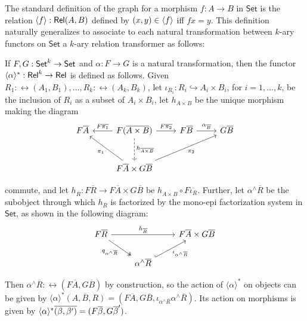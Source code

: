 \documentclass{lmcs}
\theoremstyle{plain}\newtheorem{satz}[thm]{Satz}
\newcommand{\set}{\mathsf{Set}}
\begin{document}
{The standard definition of the graph for a morphism $f : A \to B$ in
$\set$ is the relation $\langle {f} \rangle : \mathsf{Rel}(A,B)$ defined by $(x,y) \in
\langle {f} \rangle$ iff $fx = y$. This definition naturally generalizes to
associate to each natural transformation between $k$-ary functors on
$\set$ a $k$-ary relation transformer as follows:

\begin{defi}\label{dfn:graph-nat-transf}
If $F, G: \mathsf{Set}^k \to \mathsf{Set}$ and $\alpha : F \to G$ is a natural
transformation, then the functor $\langle {\alpha} \rangle^*: \mathsf{Rel}^k \to \mathsf{Rel}$
is defined as follows. Given $R_1 : \rel(A_1, B_1),...,R_k :
\rel(A_k,B_k)$, let $\iota_{R_i} : R_i \hookrightarrow A_i \times
B_i$, for $i = 1,...,k$, be the inclusion of $R_i$ as a subset of $A_i
\times B_i$,
let $h_{\overline{A \times B}}$ be the unique morphism making the diagram
{\footnotesize\[\begin{tikzcd}[row sep = large]
        F\overline{A}
        &F(\overline{A \times B})
        \ar[l, "{F\overline{\pi_1}}"']
        \ar[r, "{F\overline{\pi_2}}"]
        \ar[d, dashed, "{h_{\overline{A \times B}}}"]
        &F\overline{B}
        \ar[r, "{\alpha_{\ol{B}}}"]
        &G\overline{B} \\
        &F\overline{A} \times G\overline{B}
        \ar[ul, "{\pi_1}"] \ar[urr, "{\pi_2}"']
\end{tikzcd}\]}

\noindent
commute, and let $h_{\overline{R}} : F\overline{R} \to F\overline{A}
\times G\overline{B}$ be $h_{\overline{A \times B}} \circ
F\overline{\iota_R}$. Further, let $\alpha^\wedge\overline{R}$ be the
subobject through which $h_{\overline{R}}$ is factorized by the
mono-epi factorization system in $\set$, as shown in the
following diagram:
{\footnotesize\[\begin{tikzcd}
        F\overline{R}
        \ar[rr, "{h_{\overline{R}}}"]
        \ar[dr, twoheadrightarrow, "{q_{\alpha^\wedge\overline{R}}}"']
        &&F\overline{A} \times G\overline{B} \\
        &\alpha^\wedge\overline{R}
        \ar[ur, hookrightarrow, "{\iota_{\alpha^\wedge\overline{R}}}"']
\end{tikzcd}\]}

\noindent
Then $\alpha^\wedge\overline{R} : \rel(F\overline{A}, G\overline{B})$
by construction, so the action of $\langle \alpha \rangle^*$ on
objects can be given by $\langle \alpha \rangle^* \overline{(A,B,R)} =
(F\overline{A}, G\overline{B}, \iota_{\alpha^\wedge
  \overline{R}}\alpha^\wedge\overline{R})$. Its action on morphisms is
given by $\langle {\alpha} \rangle^*\overline{(\beta, \beta')} =
(F\overline\beta, G\overline\beta')$.
\end{defi}

}
\end{document}
